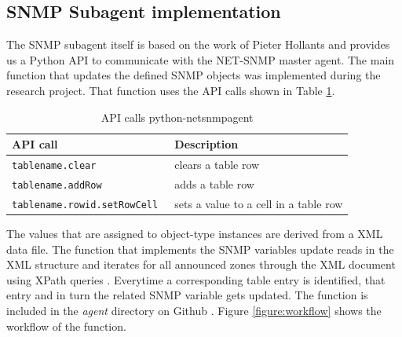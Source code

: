 \subsection{SNMP Subagent implementation}
\label{section:sub-agent-implementation}
The SNMP subagent itself is based on the work of Pieter Hollants \cite{pythonnetsnmpagent} and provides us a Python API to communicate with the NET-SNMP master agent. The main function that updates the defined SNMP objects was implemented during the research project. That function uses the API calls shown in Table \ref{table:api-calls}.

\begin{table}[h]
	\centering
\begin{tabular}{|l|p{5.5cm}|}

\hline 
\textbf{API call} & \textbf{Description} \\ 
\hline 
\tt{tablename.clear} & clears a table row\\ 
\hline 
\tt{tablename.addRow} & adds a table row\\ 
\hline 
\tt{tablename.rowid.setRowCell} & sets a value to a cell in a table row\\ 
\hline 
\end{tabular} 
\caption{API calls python-netsnmpagent}
\label{table:api-calls}
\end{table}

The values that are assigned to object-type instances are derived from a XML data file. The function that implements the SNMP variables update reads in the XML structure and iterates for all announced zones through the XML document using XPath queries \citep{xpath}. Everytime a corresponding table  entry is identified, that entry and in turn the related SNMP variable gets updated. The function is included in the \textit{agent} directory on Github \cite{github}. Figure \ref{figure:workflow} shows the  workflow of the function.

